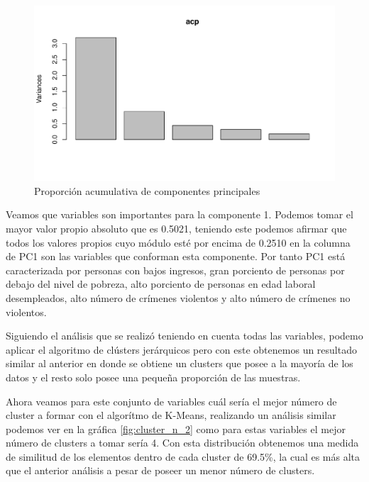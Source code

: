 \documentclass[a4paper,10pt,twocolumn]{article}
\begin{document}
	\begin{figure}[htb]
		\begin{center}
			\includegraphics[width=\columnwidth]{figures/acp_2.pdf}
		\end{center}
		\caption{Proporción acumulativa de componentes principales\label{fig:acp_2}}%
	\end{figure}

	Veamos que variables son importantes para la componente 1. Podemos tomar el mayor valor propio absoluto que es 0.5021, teniendo este podemos afirmar que todos los valores propios cuyo módulo esté por encima de 0.2510 en la columna de PC1 son las variables que conforman esta componente. Por tanto PC1 está caracterizada por personas con bajos ingresos, gran porciento de personas por debajo del nivel de pobreza, alto porciento de personas en edad laboral desempleados, alto número de crímenes violentos y alto número de crímenes no violentos.

	Siguiendo el análisis que se realizó teniendo en cuenta todas las variables, podemo aplicar el algoritmo de clústers jerárquicos pero con este obtenemos un resultado similar al anterior en donde se obtiene un clusters que posee a la mayoría de los datos y el resto solo posee una pequeña proporción de las muestras.

	Ahora veamos para este conjunto de variables cuál sería el mejor número de cluster a formar con el algorítmo de K-Means, realizando un análisis similar podemos ver en la gráfica \ref{fig:cluster_n_2} como para estas variables el mejor número de clusters a tomar sería 4. Con esta distribución obtenemos una medida de similitud de los elementos dentro de cada cluster de 69.5\%, la cual es más alta que el anterior análisis a pesar de poseer un menor número de clusters.
\end{document}

